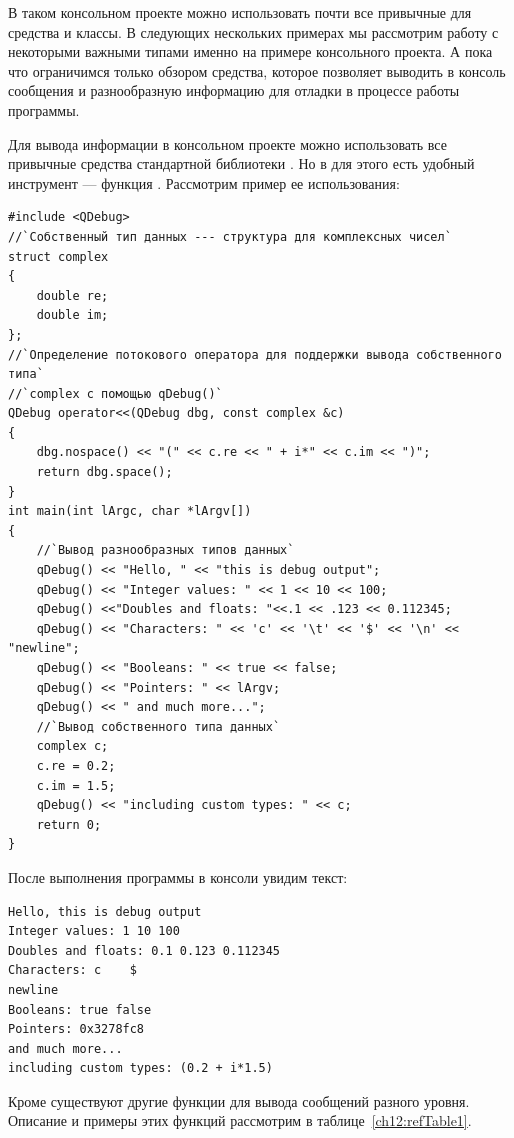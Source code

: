 В таком консольном проекте можно использовать почти все привычные для  средства и классы. В следующих
нескольких примерах мы рассмотрим работу с некоторыми важными типами  именно на примере
консольного проекта. А пока что ограничимся только обзором средства, которое позволяет выводить в консоль сообщения и
разнообразную информацию для отладки в процессе работы программы.

Для вывода информации в консольном  проекте можно использовать все привычные средства
стандартной библиотеки . Но в  для этого есть удобный инструмент --- функция
. Рассмотрим пример ее использования:
\begin{lstlisting}
#include <QDebug>
//`Собственный тип данных --- структура для комплексных чисел`
struct complex
{
    double re;
    double im;
};
//`Определение потокового оператора для поддержки вывода собственного типа`
//`complex с помощью qDebug()`
QDebug operator<<(QDebug dbg, const complex &c)
{
    dbg.nospace() << "(" << c.re << " + i*" << c.im << ")";
    return dbg.space();
}
int main(int lArgc, char *lArgv[])
{
    //`Вывод разнообразных типов данных`
    qDebug() << "Hello, " << "this is debug output";
    qDebug() << "Integer values: " << 1 << 10 << 100;
    qDebug() <<"Doubles and floats: "<<.1 << .123 << 0.112345;
    qDebug() << "Characters: " << 'c' << '\t' << '$' << '\n' << "newline";
    qDebug() << "Booleans: " << true << false;
    qDebug() << "Pointers: " << lArgv;
    qDebug() << " and much more...";
    //`Вывод собственного типа данных`
    complex c;
    c.re = 0.2;
    c.im = 1.5;
    qDebug() << "including custom types: " << c;
    return 0;
}
\end{lstlisting}

После выполнения программы в консоли увидим текст:
\begin{verbatim}
Hello, this is debug output 
Integer values: 1 10 100 
Doubles and floats: 0.1 0.123 0.112345 
Characters: c    $ 
newline 
Booleans: true false 
Pointers: 0x3278fc8 
and much more... 
including custom types: (0.2 + i*1.5)
\end{verbatim} 

Кроме  существуют другие функции для вывода сообщений разного уровня.
Описание и примеры этих функций рассмотрим в таблице~\ref{ch12:refTable1}.

